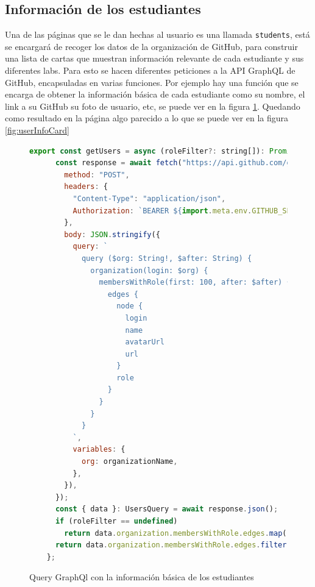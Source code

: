 \subsection{Información de los estudiantes}

Una de las páginas que se le dan hechas al usuario es una llamada \verb|students|, está se encargará de recoger los datos de la organización de GitHub, para construir una lista de cartas que muestran información relevante de cada estudiante y sus diferentes labs. Para esto se hacen diferentes peticiones a la API GraphQL de GitHub, encapsuladas en varias funciones. Por ejemplo hay una función que se encarga de obtener la información básica de cada estudiante como su nombre, el link a su GitHub su foto de usuario, etc, se puede ver en la figura \ref{fig:userInfo}. Quedando como resultado en la página algo parecido a lo que se puede ver en la figura \ref{fig:userInfoCard}

\begin{figure}
    \begin{lstlisting}[language=Javascript]
    export const getUsers = async (roleFilter?: string[]): Promise<UserInfo[]> => {
      const response = await fetch("https://api.github.com/graphql", {
        method: "POST",
        headers: {
          "Content-Type": "application/json",
          Authorization: `BEARER ${import.meta.env.GITHUB_SECRET}`,
        },
        body: JSON.stringify({
          query: `
            query ($org: String!, $after: String) {
              organization(login: $org) {
                membersWithRole(first: 100, after: $after) {
                  edges {
                    node {
                      login
                      name
                      avatarUrl
                      url
                    }
                    role
                  }
                }
              }
            }
          `,
          variables: {
            org: organizationName,
          },
        }),
      });
      const { data }: UsersQuery = await response.json();
      if (roleFilter == undefined)
        return data.organization.membersWithRole.edges.map(({ node }) => node); 
      return data.organization.membersWithRole.edges.filter((edge) => roleFilter.includes(edge.role)).map(({ node }) => node);
    };
    \end{lstlisting}
    \caption{Query GraphQl con la información básica de los estudiantes}
    \label{fig:userInfo}
\end{figure}

